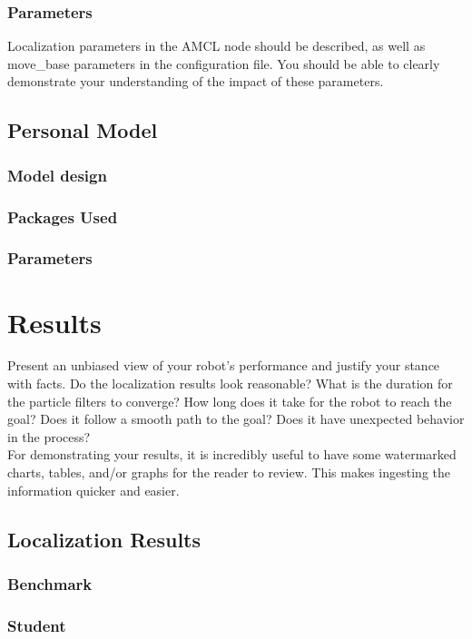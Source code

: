 \documentclass[10pt,journal,compsoc]{IEEEtran}
\begin{document}
\subsubsection{Parameters}
Localization parameters in the AMCL node should be described, as well as move\_base parameters in the configuration file. You should be able to clearly demonstrate your understanding of the impact of these parameters.

\subsection{Personal Model}
\subsubsection{Model design}
\subsubsection{Packages Used}
\subsubsection{Parameters}


\section{Results}
Present an unbiased view of your robot's performance and justify your stance with facts. Do the localization results look reasonable? What is the duration for the particle filters to converge? How long does it take for the robot to reach the goal? Does it follow a smooth path to the goal? Does it have unexpected behavior in the process? \\
For demonstrating your results, it is incredibly useful to have some watermarked charts, tables, and/or graphs for the reader to review. This makes ingesting the information quicker and easier.

\subsection{Localization Results}
\subsubsection{Benchmark}
\subsubsection{Student}
\end{document}
